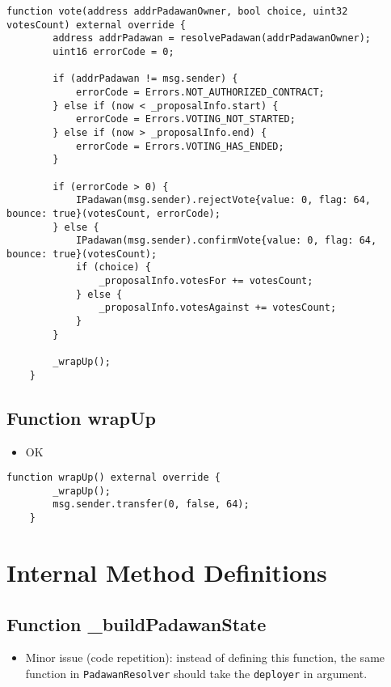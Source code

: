 \begin{lstlisting}[firstnumber=55]
    function vote(address addrPadawanOwner, bool choice, uint32 votesCount) external override {
        address addrPadawan = resolvePadawan(addrPadawanOwner);
        uint16 errorCode = 0;

        if (addrPadawan != msg.sender) {
            errorCode = Errors.NOT_AUTHORIZED_CONTRACT;
        } else if (now < _proposalInfo.start) {
            errorCode = Errors.VOTING_NOT_STARTED;
        } else if (now > _proposalInfo.end) {
            errorCode = Errors.VOTING_HAS_ENDED;
        }

        if (errorCode > 0) {
            IPadawan(msg.sender).rejectVote{value: 0, flag: 64, bounce: true}(votesCount, errorCode);
        } else {
            IPadawan(msg.sender).confirmVote{value: 0, flag: 64, bounce: true}(votesCount);
            if (choice) {
                _proposalInfo.votesFor += votesCount;
            } else {
                _proposalInfo.votesAgainst += votesCount;
            }
        }

        _wrapUp();
    }
\end{lstlisting}

\subsection{Function wrapUp}

\begin{itemize}
\item OK
\end{itemize}

\begin{lstlisting}[firstnumber=49]
    function wrapUp() external override {
        _wrapUp();
        msg.sender.transfer(0, false, 64);
    }
\end{lstlisting}

\section{Internal Method Definitions}


\subsection{Function \_{}buildPadawanState}

\begin{itemize}
\item Minor issue (code repetition): instead of defining this
  function, the same function in {\tt PadawanResolver} should take the
  {\tt deployer} in argument.
\end{itemize}

